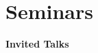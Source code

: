 \documentclass[a4paper,11pt,oneside]{amsart}
\begin{document}
\section{Seminars}





\medskip
{\large\sf \bfseries Invited Talks}
\smallskip
\end{document}
